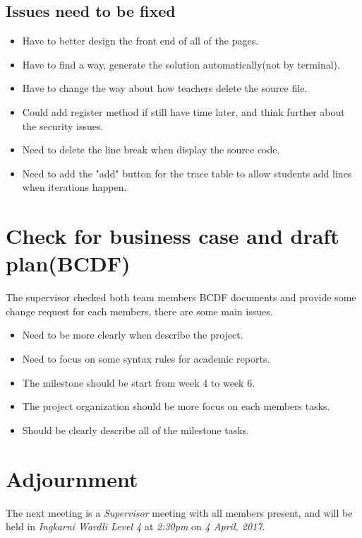 \documentclass[11pt, a4paper]{article}
\begin{document}
\subsection{Issues need to be fixed}
\begin{itemize}
\item Have to better design the front end of all of the pages.
\item Have to find a way, generate the solution automatically(not by terminal).
\item Have to change the way about how teachers delete the source file.
\item Could add register method if still have time later, and think further about the security issues.
\item Need to delete the line break when display the source code.
\item Need to add the "add" button for the trace table to allow students add lines when iterations happen.
\end{itemize}

\section{Check for business case and draft plan(BCDF)}
The supervisor checked both team members BCDF documents and provide some change request for each members, there are some main issues.
\begin{itemize}
\item  Need to be more clearly when describe the project.
\item Need to focus on some  syntax rules for  academic reports.
\item The milestone should be start from week 4 to week 6.
\item The project organization should be more focus on each members tasks.
\item Should be clearly describe all of the milestone tasks.
\end{itemize}


\section{Adjournment}
The next meeting is a \emph{Supervisor} meeting with all members present, and will be held in \emph{Ingkarni Wardli Level 4} at \emph{2:30pm} on \emph{4 April, 2017}.
\end{document}
